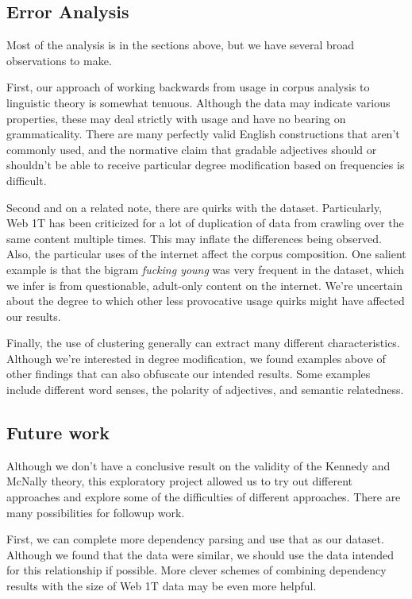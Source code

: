 \documentclass[11pt]{amsart}
\begin{document}
\subsection{Error Analysis}
Most of the analysis is in the sections above, but we have several broad observations to make.

First, our approach of working backwards from usage in corpus analysis to linguistic theory is somewhat tenuous. Although the data may indicate various properties, these may deal strictly with usage and have no bearing on grammaticality. There are many perfectly valid English constructions that aren't commonly used, and the normative claim that gradable adjectives should or shouldn't be able to receive particular degree modification based on frequencies is difficult.

Second and on a related note, there are quirks with the dataset. Particularly, Web 1T has been criticized for a lot of duplication of data from crawling over the same content multiple times. This may inflate the differences being observed. Also, the particular uses of the internet affect the corpus composition. One salient example is that the bigram \textit{fucking young} was very frequent in the dataset, which we infer is from questionable, adult-only content on the internet. We're uncertain about the degree to which other less provocative usage quirks might have affected our results.

Finally, the use of clustering generally can extract many different characteristics. Although we're interested in degree modification, we found examples above of other findings that can also obfuscate our intended results. Some examples include different word senses, the polarity of adjectives, and semantic relatedness.

\subsection{Future work}
Although we don't have a conclusive result on the validity of the Kennedy and McNally theory, this exploratory project allowed us to try out different approaches and explore some of the difficulties of different approaches. There are many possibilities for followup work.

First, we can complete more dependency parsing and use that as our dataset. Although we found that the data were similar, we should use the data intended for this relationship if possible. More clever schemes of combining dependency results with the size of Web 1T data may be even more helpful.
\end{document}
